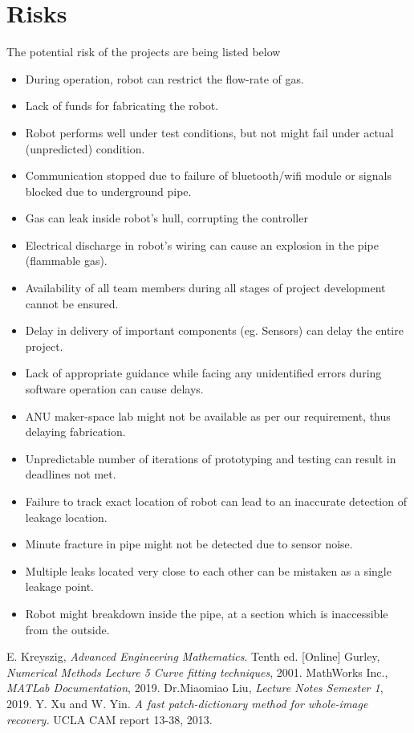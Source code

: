 \documentclass[a4paper]{article}
\begin{document}
\section{Risks}
\label{risks}
The potential risk of the projects are being listed below
\begin{itemize}
    \item {During operation, robot can restrict the flow-rate of gas.}
    \item{Lack of funds for fabricating the robot.}
    \item{Robot performs well under test conditions, but not might fail under actual (unpredicted) condition.}
    \item{Communication stopped due to failure of bluetooth/wifi module or signals blocked due to underground pipe.}
    \item{Gas can leak inside robot’s hull, corrupting the controller}
    \item{Electrical discharge in robot’s wiring can cause an explosion in the pipe (flammable gas).}
    \item{Availability of all team members during all stages of project development cannot be ensured.}
    \item{Delay in delivery of important components (eg. Sensors) can delay the entire project.}
    \item{Lack of appropriate guidance while facing any unidentified errors during software operation can cause delays.}
    \item{ANU maker-space lab might not be available as per our requirement, thus delaying fabrication.}
    \item{Unpredictable number of iterations of prototyping and testing can result in deadlines not met.}
    \item{Failure to track exact location of robot can lead to an inaccurate detection of leakage location.}
    \item{Minute fracture in pipe might not be detected due to sensor noise.}
    \item{Multiple leaks located very close to each other can be mistaken as a single leakage point.}
    \item{Robot might breakdown inside the pipe, at a section which is inaccessible from the outside.}
\end{itemize}
\begin{thebibliography}{9}
  E. Kreyszig,
  \emph{Advanced Engineering Mathematics}.
   Tenth ed. [Online]
  Gurley,
  \emph{Numerical Methods Lecture 5 Curve fitting techniques},
   2001.
  MathWorks Inc.,
  \emph{MATLab Documentation},
   2019.
  Dr.Miaomiao Liu,
  \emph{Lecture Notes Semester 1},
   2019.
Y. Xu and W. Yin. \emph{A fast patch-dictionary method for whole-image recovery.} UCLA CAM report 13-38, 2013.
\end{thebibliography}
\end{document}

